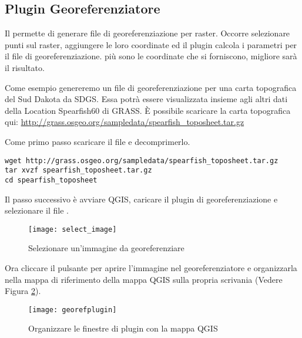 
\subsection{Plugin Georeferenziatore}


Il  permette di generare file di georeferenziazione per raster. Occorre selezionare punti sul raster, aggiungere le loro coordinate ed il plugin calcola i parametri per il file di georeferenziazione. più sono le coordinate che si forniscono, migliore sarà il risultato.

Come esempio genereremo un file di georeferenziazione per una carta topografica del Sud Dakota da SDGS. Essa potrà essere visualizzata insieme agli altri dati della Location Spearfish60 di GRASS. È possibile scaricare la carta topografica qui: \url{http://grass.osgeo.org/sampledata/spearfish\_toposheet.tar.gz}

Come primo passo scaricare il file e decomprimerlo.

\begin{verbatim}
wget http://grass.osgeo.org/sampledata/spearfish_toposheet.tar.gz
tar xvzf spearfish_toposheet.tar.gz
cd spearfish_toposheet
\end{verbatim}

Il passo successivo è avviare QGIS, caricare il plugin di georeferenziazione e selezionare il file .

\begin{figure}[ht]
\begin{center}
\caption{Selezionare un'immagine da georeferenziare \nixcaption}\label{fig:select_image}\smallskip
  \texttt{[image: select\_image]}
\end{center}
\end{figure}

Ora cliccare il pulsante  per aprire l'immagine nel georeferenziatore e organizzarla nella mappa di riferimento della mappa QGIS sulla propria scrivania (Vedere Figura \ref{fig:georefplugin}).

\begin{figure}[ht]
\begin{center}
  \caption{Organizzare le finestre di plugin con la mappa QGIS \nixcaption}\label{fig:georefplugin}\smallskip
  \texttt{[image: georefplugin]}
\end{center}
\end{figure}

